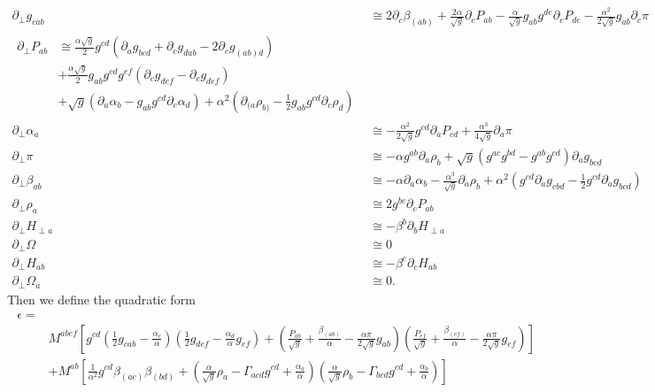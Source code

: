 \documentclass[letterpaper,nofootinbib,prd,amsmath,onecolumn]{revtex4-1}
\begin{document}
\begin{subequations}\label{symmetric hamilton}
\begin{align}
\partial_{\perp}g_{cab} & \cong 2\partial_{c}\beta_{(ab)} + \frac{2\alpha}{\sqrt{g}}\partial_{c}P_{ab} - \frac{\alpha}{\sqrt{g}}g_{ab}g^{de}\partial_{c}P_{de} - \frac{\alpha^{2}}{2\sqrt{g}}g_{ab}\partial_{c}\pi\\
\begin{split}
\partial_{\perp}P_{ab} & \cong \frac{\alpha\sqrt{g}}{2}g^{cd}\left(\partial_{a}g_{bcd} + \partial_{c}g_{dab} - 2\partial_{c}g_{(ab)d}\right)\\
& + \frac{\alpha \sqrt{g}}{2}g_{ab}g^{cd}g^{ef}\left(\partial_{c}g_{def} - \partial_{c}g_{def}\right)\\
& + \sqrt{g}\left(\partial_{a}\alpha_{b} - g_{ab}g^{cd}\partial_{c}\alpha_{d}\right) + \alpha^{2}\left(\partial_{(a}\rho_{b)} - \frac{1}{2}g_{ab}g^{cd}\partial_{c}\rho_{d}\right)
\end{split}\\
\partial_{\perp}\alpha_{a} & \cong -\frac{\alpha^{2}}{2\sqrt{g}}g^{cd}\partial_{a}P_{cd} + \frac{\alpha^{3}}{4\sqrt{g}}\partial_{a}\pi\\
\partial_{\perp}\pi & \cong - \alpha g^{ab}\partial_{a}\rho_{b} + \sqrt{g}\left(g^{ac}g^{bd} - g^{ab}g^{cd}\right)\partial_{a}g_{bcd}\\
\partial_{\perp}\beta_{ab} & \cong -\alpha \partial_{a}\alpha_{b} - \frac{\alpha^{3}}{\sqrt{g}}\partial_{a}\rho_{b} + \alpha^{2}\left(g^{cd}\partial_{a}g_{cbd} - \frac{1}{2}g^{cd}\partial_{a}g_{bcd}\right)\\
\partial_{\perp}\rho_{a} & \cong 2g^{bc}\partial_{c}P_{ab}\\
\partial_{\perp}H_{\perp a} & \cong -\beta^{b}\partial_{b}H_{\perp a}\\
\partial_{\perp}\Omega & \cong 0\\
\partial_{\perp}H_{ab} & \cong - \beta^{c}\partial_{c}H_{ab}\\
\partial_{\perp}\Omega_{a} & \cong 0.
\end{align}
\end{subequations}
Then we define the quadratic form
\begin{align}
\begin{split}
\epsilon = & \\
& M^{abef}\left[g^{cd}\left(\frac{1}{2}g_{cab} - \frac{\alpha_{c}}{\alpha}\right)\left(\frac{1}{2}g_{def} - \frac{\alpha_{d}}{\alpha}g_{ef}\right) + \left(\frac{P_{ab}}{\sqrt{g}} + \frac{\beta_{(ab)}}{\alpha} - \frac{\alpha \pi}{2\sqrt{g}}g_{ab}\right)\left(\frac{P_{ef}}{\sqrt{g}} + \frac{\beta_{(ef)}}{\alpha} - \frac{\alpha \pi}{2\sqrt{g}}g_{ef}\right)\right]\\
& + M^{ab}\left[\frac{1}{\alpha^{2}}g^{cd}\beta_{(ac)}\beta_{(bd)} + \left(\frac{\alpha}{\sqrt{g}}\rho_{a} - \Gamma_{acd}g^{cd} + \frac{\alpha_{a}}{\alpha}\right) \left(\frac{\alpha}{\sqrt{g}}\rho_{b} - \Gamma_{bcd}g^{cd} + \frac{\alpha_{b}}{\alpha}\right)\right]
\end{split}
\end{align}
\end{document}
